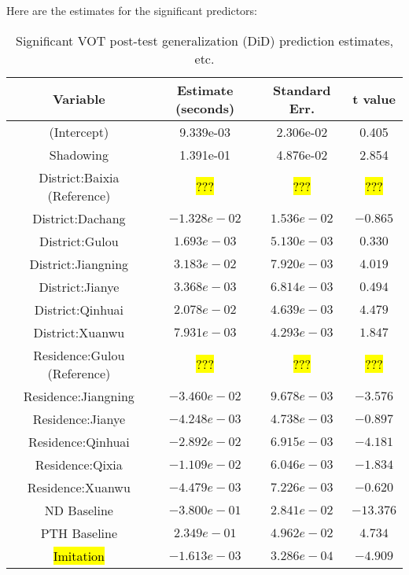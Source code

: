 Here are the estimates for the significant predictors:
\begin{table}
\centering
 \begin{tabular}{|c||c|c|c|} 
 \hline
 \textbf{Variable} & \textbf{Estimate (seconds)} & \textbf{Standard Err.} & \textbf{t value}\\ [0.5ex] 
 \hline
  (Intercept) & 9.339e-03 & 2.306e-02 & 0.405\\ 
 \hline
  Shadowing & 1.391e-01 & 4.876e-02 & 2.854\\ 
 \hline
 District:Baixia (Reference) & \hl{???} & \hl{???} & \hl{???}\\
 \hline
 District:Dachang & $-1.328e-02$ & $1.536e-02$ & $-0.865$\\
 \hline
 District:Gulou & $1.693e-03$ & $5.130e-03$ & $0.330$\\
 \hline
 District:Jiangning & $3.183e-02$ & $7.920e-03$ & $4.019$\\
 \hline
 District:Jianye & $3.368e-03$ & $6.814e-03$ & $0.494$\\
 \hline
 District:Qinhuai & $2.078e-02$ & $4.639e-03$ & $4.479$\\
 \hline
 District:Xuanwu & $7.931e-03$ & $4.293e-03$ & $1.847$\\
 \hline
 Residence:Gulou (Reference) & \hl{???} & \hl{???} & \hl{???}\\
 \hline
  Residence:Jiangning & $-3.460e-02$ & $9.678e-03$ & $-3.576$\\
 \hline
  Residence:Jianye & $-4.248e-03$ & $4.738e-03$ & $-0.897$\\
 \hline
  Residence:Qinhuai & $-2.892e-02$ & $6.915e-03$ & $-4.181$\\
 \hline
  Residence:Qixia & $-1.109e-02$ & $6.046e-03$ & $-1.834$\\
 \hline
  Residence:Xuanwu & $-4.479e-03$ & $7.226e-03$ & $-0.620$\\
 \hline
 ND Baseline & $-3.800e-01$ & $2.841e-02$ & $-13.376$\\
 \hline%
 PTH Baseline & $2.349e-01$ & $4.962e-02$ & $4.734$\\
 \hline
 \hl{Imitation} & $-1.613e-03$ & $3.286e-04$ & $-4.909$\\%
 \hline
\end{tabular}
\caption{Significant VOT post-test generalization (DiD) prediction estimates, etc.}
\label{tab:VOTpostEstimates}
\end{table}

